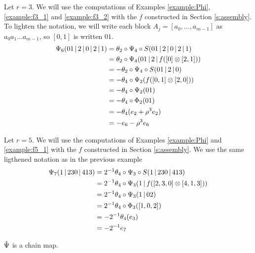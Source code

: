 \begin{example}\label{example:psi3}
Let $r=3$. We will use the computations of Examples \ref{example:Phi}, \ref{example:f3_1} and \ref{example:f3_2} with the $f$ constructed in Section \ref{s:assembly}. To lighten the notation, we will write each block $A_j = [a_0,\ldots,a_{m-1}]$ as $a_0a_1\ldots a_{m-1}$, so $[0,1]$ is written $01$.
	\begin{align*}
		\Psi_6(01\operatorname{|} 2\operatorname{|} 0\operatorname{|} 2\operatorname{|} 1) 
		&= \theta_2\circ \Psi_4\circ S(01\operatorname{|} 2\operatorname{|} 0\operatorname{|} 2\operatorname{|} 1)
		\\
		&= \theta_2\circ \Psi_4(01\operatorname{|} 2\operatorname{|} f([0]\otimes [2,1]))
		\\
		&= -\theta_2\circ \Psi_4\circ S(01\operatorname{|} 2\operatorname{|} 0)
		\\
		&= -\theta_4\circ \Psi_2(f([0,1]\otimes [2,0]))
		\\
		&= -\theta_4\circ \Psi_2(01)
		\\
		&= -\theta_4\circ \Phi_2(01)
		\\
		&= -\theta_4(e_2 + \rho^3e_2)
		\\
		&= -e_6 - \rho^3e_6
	\end{align*}
\end{example}
\begin{example}\label{example:psi5}
Let $r=5$. We will use the computations of Examples \ref{example:Phi} and \ref{example:f5_1} with the $f$ constructed in Section \ref{s:assembly}. We use the same ligthened notation as in the previous example
	\begin{align*}
		\Psi_7(1\operatorname{|} 230\operatorname{|} 413) 
		&= 2^{-1}\theta_4\circ \Psi_3\circ S(1\operatorname{|} 230\operatorname{|} 413)
		\\
		&= 2^{-1}\theta_4\circ \Psi_3(1\operatorname{|} f([2,3,0]\otimes [4,1,3]))
		\\
		&= 2^{-1}\theta_4\circ \Psi_3(1\operatorname{|} 02)
		\\
		&= 2^{-1}\theta_4\circ \Phi_3([1,0,2])
		\\
		&= -2^{-1}\theta_4(e_3)
		\\
		&= -2^{-1}e_7
	\end{align*}
\end{example}

\begin{proposition}\label{prop:chain}
	$\operatorname{\check{\Psi}}$ is a chain map. %
\end{proposition}

